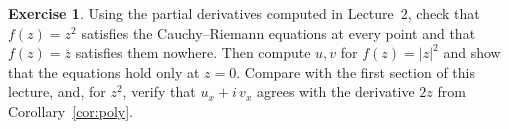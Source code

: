 \documentclass[11pt]{article}
\theoremstyle{plain}
\theoremstyle{definition}
\newtheorem{exercise}[theorem]{Exercise}
\theoremstyle{remark}
\numberwithin{equation}{section}
\begin{document}
\begin{exercise}
Using the partial derivatives computed in Lecture~2, check that
$f(z)=z^2$ satisfies the Cauchy--Riemann equations at every point and
that $f(z)=\overline z$ satisfies them nowhere.  Then compute $u,v$ for
$f(z)=|z|^2$ and show that the equations hold only at $z=0$.  Compare with the first section of
this lecture, and, for $z^2$, verify that
$u_x+i\,v_x$ agrees with the derivative $2z$ from
Corollary~\ref{cor:poly}.
\end{exercise}
\end{document}
